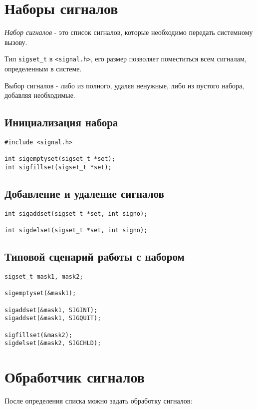 \section{Наборы сигналов}
\label{sigset}
\emph{Набор сигналов} - это список сигналов, которые необходимо передать системному вызову.

Тип \verb+sigset_t+ в \verb+<signal.h>+, его размер позволяет поместиться всем сигналам, определенным в системе.

Выбор сигналов - либо из полного, удаляя ненужные, либо из пустого набора, добавляя необходимые.

\subsection{Инициализация набора}

\begin{verbatim}
#include <signal.h>

int sigemptyset(sigset_t *set);
int sigfillset(sigset_t *set);
\end{verbatim}

\subsection{Добавление и удаление сигналов}

\begin{verbatim}
int sigaddset(sigset_t *set, int signo);

int sigdelset(sigset_t *set, int signo);
\end{verbatim}

\subsection{Типовой сценарий работы с набором}
\begin{verbatim}
sigset_t mask1, mask2;

sigemptyset(&mask1);

sigaddset(&mask1, SIGINT);
sigaddset(&mask1, SIGQUIT);

sigfillset(&mask2);
sigdelset(&mask2, SIGCHLD);
\end{verbatim}

\section{Обработчик сигналов}

После определения списка можно задать обработку сигналов:

